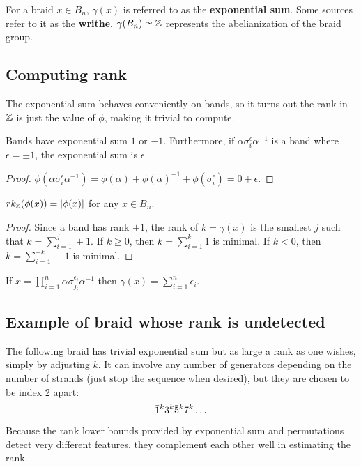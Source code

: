 \documentclass[12pt]{thesis}
\begin{document}
\begin{definition}
    For a braid $x \in B_{n}$,
    $\gamma(x)$ is referred to as the \textbf{exponential sum}.
    Some sources refer to it as the \textbf{writhe}.
    $\gamma(B_{n}) \simeq \mathbb{Z}$ represents the abelianization of the braid group.
\end{definition}

\subsection{Computing rank}

The exponential sum behaves conveniently on bands,
so it turns out the rank in $\mathbb{Z}$ is just the value of $\phi$,
making it trivial to compute.

\begin{proposition}
    \label{prop:exponential-sum-of-band}
Bands have exponential sum $1$ or $-1$.
Furthermore, if $\alpha \sigma_{i}^{\epsilon} \alpha^{-1}$ is a band where $\epsilon = \pm 1$,
the exponential sum is $\epsilon$.
\end{proposition}

\begin{proof}
$\phi(\alpha \sigma_{i}^{\epsilon}\alpha^{-1}) = \phi(\alpha) + \phi(\alpha)^{-1} + \phi(\sigma_{i}^{\epsilon}) = 0 + \epsilon$.
\end{proof}

\begin{corollary}
    $rk_{\mathbb{Z}}(\phi(x)) = |\phi(x)|$ for any $x \in B_{n}$.
\end{corollary}

\begin{proof}
    Since a band has rank $\pm 1$, the rank of $k = \gamma(x)$ is 
    the smallest $j$ such that $k = \sum_{i=1}^{j} \pm 1$.
    If $k \geq 0$, then $k = \sum_{i=1}^{k} 1$ is minimal.
    If $k < 0$, then $k = \sum_{i=1}^{-k} -1$ is minimal.
\end{proof}

\begin{corollary}
    If $x = \prod_{i = 1}^{n} \alpha \sigma_{j_{i}}^{\epsilon_{i}}\alpha^{-1}$
    then $\gamma(x) = \sum_{i=1}^{n} \epsilon_{i}$.
\end{corollary}

\subsection{Example of braid whose rank is undetected}

The following braid has trivial exponential sum
but as large a rank as one wishes, simply by adjusting
$k$.
It can involve any number of generators depending
on the number of strands (just stop the sequence when desired),
but they are chosen to be index 2 apart:
\[
    \bar{1}^{k} 3^{k} \bar{5}^{k} 7^{k} \ldots 
\]
Because the rank lower bounds provided by exponential sum and permutations
detect very different features,
they complement each other well in estimating the rank.
\end{document}
